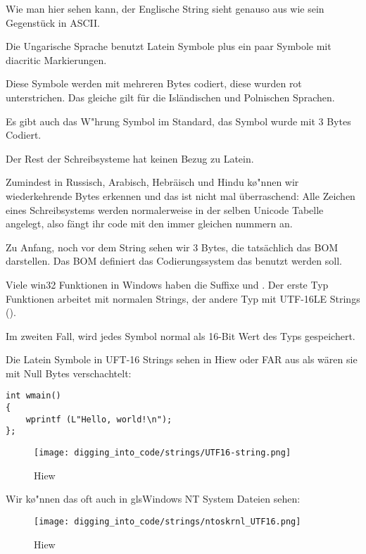 Wie man hier sehen kann, der Englische String sieht genauso aus wie sein Gegenst\"uck in ASCII.

Die Ungarische Sprache benutzt Latein Symbole plus ein paar Symbole mit diacritic Markierungen.

Diese Symbole werden mit mehreren Bytes codiert, diese wurden rot unterstrichen.
Das gleiche gilt f\"ur die Isl\"andischen und Polnischen Sprachen.

Es gibt auch das  W\a"hrung Symbol im Standard, das Symbol wurde mit 3 Bytes Codiert.

Der Rest der Schreibsysteme hat keinen Bezug zu Latein.

Zumindest in Russisch, Arabisch, Hebr\"aisch und Hindu k\o"nnen wir wiederkehrende Bytes erkennen und das ist nicht mal \"uberraschend:
Alle Zeichen eines Schreibsystems werden normalerweise in der selben Unicode Tabelle angelegt, also f\"angt ihr code mit den 
immer gleichen nummern an. %

Zu Anfang, noch vor dem  String sehen wir 3 Bytes, die tats\"achlich das \ac{BOM} darstellen.
Das \ac{BOM} definiert das Codierungssystem das benutzt werden soll.


Viele win32 Funktionen in Windows haben die Suffixe  und . 
Der erste Typ Funktionen arbeitet mit normalen Strings, der andere Typ mit 
UTF-16LE Strings (). 

Im zweiten Fall, wird jedes Symbol normal als 16-Bit Wert des Typs  gespeichert.

Die Latein Symbole in UFT-16 Strings sehen in Hiew oder FAR aus als w\"aren sie mit Null Bytes verschachtelt:

\begin{lstlisting}[style=customc]
int wmain()
{
	wprintf (L"Hello, world!\n");
};
\end{lstlisting}

\begin{figure}[H]
\centering
\texttt{[image: digging\_into\_code/strings/UTF16-string.png]}
\caption{Hiew}
\end{figure}

Wir k\o"nnen das oft auch in gls{Windows NT} System Dateien sehen:

\begin{figure}[H]
\centering
\texttt{[image: digging\_into\_code/strings/ntoskrnl\_UTF16.png]}
\caption{Hiew}
\end{figure}

